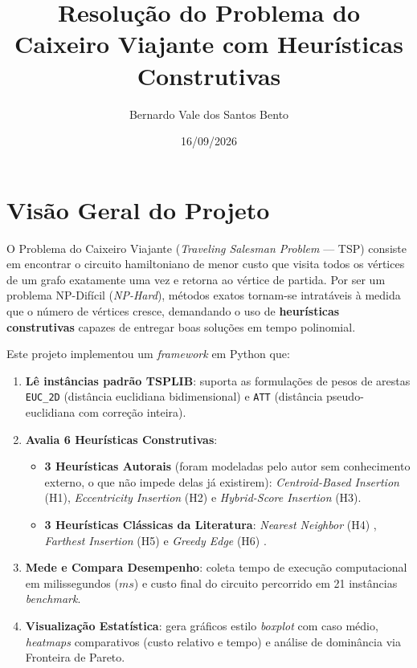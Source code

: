\documentclass[12pt, a4paper]{article}
\title{Resolução do Problema do Caixeiro Viajante com Heurísticas Construtivas}
\author{Bernardo Vale dos Santos Bento}
\date{16/09/2026}
\begin{document}
\maketitle

\section{Visão Geral do Projeto}

O Problema do Caixeiro Viajante (\textit{Traveling Salesman Problem} --- TSP) consiste em
encontrar o circuito hamiltoniano de menor custo que visita todos os vértices de um grafo
exatamente uma vez e retorna ao vértice de partida. Por ser um problema NP-Difícil
(\textit{NP-Hard}), métodos exatos tornam-se intratáveis à medida que o número de vértices
cresce, demandando o uso de \textbf{heurísticas construtivas} capazes de entregar boas
soluções em tempo polinomial.

Este projeto implementou um \textit{framework} em Python que:
\begin{enumerate}
    \item \textbf{Lê instâncias padrão TSPLIB}: suporta as formulações de pesos de arestas
          \texttt{EUC\_2D} (distância euclidiana bidimensional) e \texttt{ATT} (distância
          pseudo-euclidiana com correção inteira).
    \item \textbf{Avalia 6 Heurísticas Construtivas}:
          \begin{itemize}
              \item \textbf{3 Heurísticas Autorais} (foram modeladas pelo autor sem conhecimento externo, o que não impede delas já existirem): \textit{Centroid-Based Insertion} (H1),
                    \textit{Eccentricity Insertion} (H2) e \textit{Hybrid-Score Insertion} (H3).
              \item \textbf{3 Heurísticas Clássicas da Literatura}: \textit{Nearest Neighbor}
                    (H4) \cite{rosenkrantz1977}, \textit{Farthest Insertion} (H5)
                    \cite{rosenkrantz1977} e \textit{Greedy Edge} (H6) \cite{bentley1992}.
          \end{itemize}
    \item \textbf{Mede e Compara Desempenho}: coleta tempo de execução computacional em
          milissegundos ($ms$) e custo final do circuito percorrido em 21 instâncias
          \textit{benchmark}.
    \item \textbf{Visualização Estatística}: gera gráficos estilo \textit{boxplot} com caso
          médio, \textit{heatmaps} comparativos (custo relativo e tempo) e análise de
          dominância via Fronteira de Pareto.
\end{enumerate}
\end{document}
